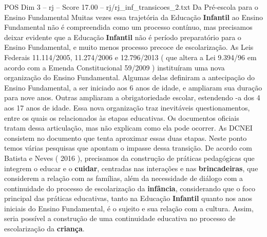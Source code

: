 \begin{textsample}{POS Dim 3 – rj – Score 17.00 – rj/rj\_inf\_transicoes\_2.txt}
Da Pré-escola para o Ensino Fundamental Muitas vezes essa trajetória da Educação \textbf{Infantil} ao Ensino Fundamental não é compreendida como um processo contínuo, mas precisamos deixar evidente que a Educação \textbf{Infantil} não é período preparatório para o Ensino Fundamental, e muito menos processo precoce de escolarização.
As Leis Federais 11.114/2005, 11.274/2006 e 12.796/2013 ( que altera a Lei 9.394/96 em acordo com a Emenda Constitucional 59/2009 ) instituíram uma nova organização do Ensino Fundamental.
Algumas delas definiram a antecipação do Ensino Fundamental, a ser iniciado aos 6 anos de idade, e ampliaram sua duração para nove anos.
Outras ampliaram a obrigatoriedade escolar, estendendo -a dos 4 aos 17 anos de idade.
Essa nova organização traz inevitáveis questionamentos, entre os quais os relacionados às etapas educativas.
Os documentos oficiais tratam dessa articulação, mas não explicam como ela pode ocorrer.
As DCNEI consistem no documento que tenta aproximar essas duas etapas.
Neste ponto temos várias pesquisas que apontam o impasse dessa transição.
De acordo com Batista e Neves ( 2016 ), precisamos da construção de práticas pedagógicas que integrem o educar e o \textbf{cuidar}, centradas nas interações e nas \textbf{brincadeiras}, que considerem a relação com as famílias, além da necessidade de diálogo com a continuidade do processo de escolarização da \textbf{infância}, considerando que o foco principal das práticas educativas, tanto na Educação \textbf{Infantil} quanto nos anos iniciais do Ensino Fundamental, é o sujeito e sua relação com a cultura.
Assim, seria possível a construção de uma continuidade educativa no processo de escolarização da \textbf{criança}.

\end{textsample}
